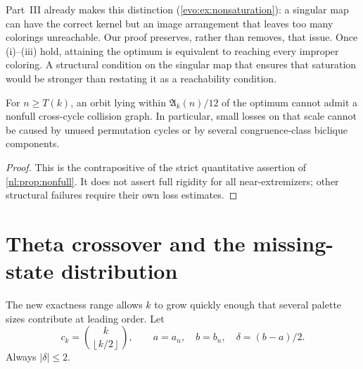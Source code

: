\documentclass[11pt,a4paper]{article}
\numberwithin{equation}{section}
\theoremstyle{definition}
\theoremstyle{remark}
\newcommand{\nlenv}{\mathfrak A}
\newcommand{\nlfloor}[1]{\left\lfloor #1\right\rfloor}
\begin{document}
\begin{remark}
Part~III already makes this distinction (\cref{evo:ex:nonsaturation}): a singular map can have
the correct kernel but an image arrangement that leaves too many
colorings unreachable. Our proof preserves, rather than removes, that
issue. Once (i)--(iii) hold, attaining the optimum is equivalent to reaching
every improper coloring. A structural condition on the singular map that
ensures that saturation would be stronger than restating it as a
reachability condition.
\end{remark}

\begin{corollary}\label{nl:cor:gap}
For $n\ge T(k)$, an orbit lying within $\nlenv_k(n)/12$ of the optimum cannot
admit a nonfull cross-cycle collision graph. In particular, small losses
on that scale cannot be caused by unused permutation cycles or by several
congruence-class biclique components.
\end{corollary}
\begin{proof}
This is the contrapositive of the strict quantitative assertion of
\cref{nl:prop:nonfull}. It does not assert full rigidity for all near-extremizers;
other structural failures require their own loss estimates.
\end{proof}

\section{Theta crossover and the missing-state distribution}\label{nl:sec:theta}

The new exactness range allows $k$ to grow quickly enough that several
palette sizes contribute at leading order. Let
\[
 c_k=\binom{k}{\nlfloor{k/2}},\qquad
 a=a_n,\quad b=b_n,\quad\delta=(b-a)/2.
\]
Always $|\delta|\le2$.
\end{document}
